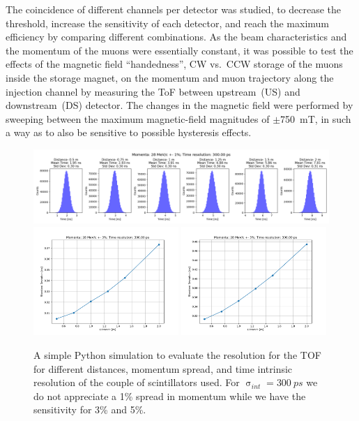 \begin{refsection}
        \noindent
        The coincidence of different channels per detector was studied, to decrease the threshold, increase the sensitivity of each detector, and reach the maximum efficiency by comparing different combinations. 
        As the beam characteristics and the momentum of the muons were essentially constant, it was possible to test the effects of the magnetic field ``handedness'', CW vs.\ CCW storage of the muons inside the storage magnet, on the momentum and muon trajectory along the injection channel by measuring the ToF between upstream~(US) and downstream~(DS) detector. 
        The changes in the magnetic field were performed by sweeping between the maximum magnetic-field magnitudes of $\pm$\SI{750}{\milli\tesla}, in such a way as to also be sensitive to possible hysteresis effects.
                
        \begin{figure}
            \centering
            \includegraphics[width=\textwidth]{Figures/muEDM_Dec2023/histo_28_1_300.png}\\
            \includegraphics[width=0.49\textwidth]{Figures/muEDM_Dec2023/trend_28_3_300.00.png}
            \hfill
            \includegraphics[width=0.49\textwidth]{Figures/muEDM_Dec2023/trend_28_5_300.00.png}
            \caption[muEDM 2023: TOF momentum spread]{A simple Python simulation to evaluate the resolution for the TOF for different distances, momentum spread, and time intrinsic resolution of the couple of scintillators used. For $\upsigma_{int}=\SI{300}{ps}$ we do not appreciate a 1\% spread in momentum while we have the sensitivity for 3\% and 5\%.}
            \label{fig:muEDM:bt2023:TOFPython}
        \end{figure}


\end{refsection}
